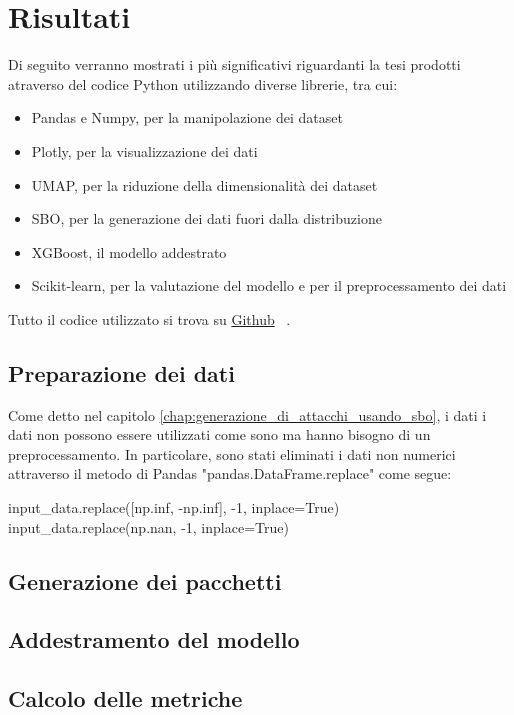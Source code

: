 \chapter{Risultati}

Di seguito verranno mostrati i più significativi riguardanti la tesi prodotti atraverso del codice Python utilizzando diverse librerie, tra cui:

\begin{itemize}
    \item Pandas e Numpy, per la manipolazione dei dataset
    \item Plotly, per la visualizzazione dei dati
    \item UMAP, per la riduzione della dimensionalità dei dataset 
    \item SBO, per la generazione dei dati fuori dalla distribuzione
    \item XGBoost, il modello addestrato
    \item Scikit-learn, per la valutazione del modello e per il preprocessamento dei dati
\end{itemize}

Tutto il codice utilizzato si trova su \href{https://github.com/guglielmobartelloni/thesis-utils}{Github}~\cite{github} .

\section{Preparazione dei dati}

Come detto nel capitolo \ref{chap:generazione_di_attacchi_usando_sbo}, i dati i dati non possono essere utilizzati come sono ma hanno bisogno di un preprocessamento. In particolare, sono stati eliminati i dati non numerici attraverso il metodo di Pandas "pandas.DataFrame.replace" come segue:


\begin{python}
input_data.replace([np.inf, -np.inf], -1, inplace=True)
input_data.replace(np.nan, -1, inplace=True)
\end{python}


\section{Generazione dei pacchetti}

\section{Addestramento del modello}

\section{Calcolo delle metriche}


